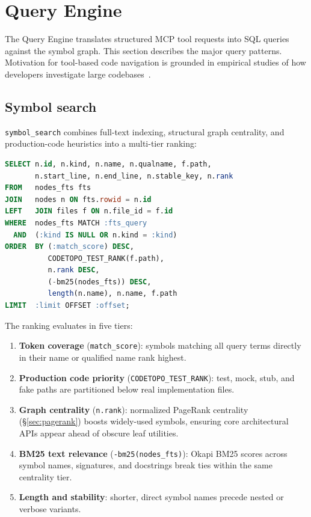 \section{Query Engine}
\label{sec:query-engine}

The Query Engine translates structured MCP tool requests into SQL queries
against the symbol graph. This section describes the major query patterns.
Motivation for tool-based code navigation is grounded in empirical studies of
how developers investigate large codebases~\cite{robillard2004codenav}.

\subsection{Symbol search}

\texttt{symbol\_search} combines full-text indexing, structural graph
centrality, and production-code heuristics into a multi-tier ranking:

\begin{lstlisting}[language=sql]
SELECT n.id, n.kind, n.name, n.qualname, f.path,
       n.start_line, n.end_line, n.stable_key, n.rank
FROM   nodes_fts fts
JOIN   nodes n ON fts.rowid = n.id
LEFT   JOIN files f ON n.file_id = f.id
WHERE  nodes_fts MATCH :fts_query
  AND  (:kind IS NULL OR n.kind = :kind)
ORDER  BY (:match_score) DESC,
          CODETOPO_TEST_RANK(f.path),
          n.rank DESC,
          (-bm25(nodes_fts)) DESC,
          length(n.name), n.name, f.path
LIMIT  :limit OFFSET :offset;
\end{lstlisting}

The ranking evaluates in five tiers:
\begin{enumerate}
  \item \textbf{Token coverage} (\texttt{match\_score}): symbols matching all
        query terms directly in their name or qualified name rank highest.
  \item \textbf{Production code priority} (\texttt{CODETOPO\_TEST\_RANK}):
        test, mock, stub, and fake paths are partitioned below real
        implementation files.
  \item \textbf{Graph centrality} (\texttt{n.rank}): normalized PageRank
        centrality (\S\ref{sec:pagerank}) boosts widely-used symbols,
        ensuring core architectural APIs appear ahead of obscure leaf utilities.
  \item \textbf{BM25 text relevance} (\texttt{-bm25(nodes\_fts)}): Okapi BM25
        scores across symbol names, signatures, and docstrings break ties
        within the same centrality tier.
  \item \textbf{Length and stability}: shorter, direct symbol names precede
        nested or verbose variants.
\end{enumerate}

